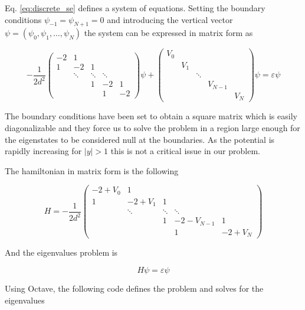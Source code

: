 \documentclass{article}
\begin{document}
Eq. \eqref{eq:discrete_se} defines a system of equations. Setting the boundary conditions \( \psi_{-1} = \psi_{N+1} = 0 \) and introducing the vertical vector \( \psi = (\psi_0, \psi_1, \dots, \psi_N) \) the system can be expressed in matrix form as

\begin{equation}
-\frac{1}{2d^2}
  \begin{pmatrix}
    -2 & 1 &&& \\
    1 & -2 & 1 && \\
    & \ddots & \ddots & \ddots & \\
    && 1 & -2 & 1 \\
    &&& 1 & -2
  \end{pmatrix}
\psi +
  \begin{pmatrix}
    V_0 \\
    & V_1 \\
    && \ddots \\
    &&& V_{N-1} \\
    &&&& V_N
  \end{pmatrix}
\psi = \varepsilon \psi
\end{equation}

The boundary conditions have been set to obtain a square matrix which is easily diagonalizable and they force us to solve the problem in a region large enough for the eigenstates to be considered null at the boundaries. As the potential is rapidly increasing for \( |y| > 1 \) this is not a critical issue in our problem.

The hamiltonian in matrix form is the following

\begin{equation}
H = -\frac{1}{2d^2}
  \begin{pmatrix}
    -2+V_0 & 1 &&& \\
    1 & -2+V_1 & 1 && \\
    & \ddots & \ddots & \ddots & \\
    && 1 & -2-V_{N-1} & 1 \\
    &&& 1 & -2+V_N
  \end{pmatrix}
\end{equation}

And the eigenvalues problem is

\begin{equation}
H\psi = \varepsilon \psi
\end{equation}

Using Octave, the following code defines the problem and solves for the eigenvalues
\end{document}
